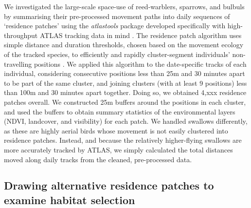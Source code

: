 We investigated the large-scale space-use of reed-warblers, sparrows, and bulbuls by summarising their pre-processed movement paths into daily sequences of `residence patches' using the \textit{atlastools} package developed specifically with high-throughput ATLAS tracking data in mind \citep{gupte2021b}.
The residence patch algorithm uses simple distance and duration thresholds, chosen based on the movement ecology of the tracked species, to efficiently and rapidly cluster-segment individuals' non-travelling positions \citep{gupte2021b}.
We applied this algorithm to the date-specific tracks of each individual, considering consecutive positions less than 25m and 30 minutes apart to be part of the same cluster, and joining clusters (with at least 9 positions) less than 100m and 30 minutes apart together.
Doing so, we obtained 4,xxx residence patches overall.
We constructed 25m buffers around the positions in each cluster, and used the buffers to obtain summary statistics of the environmental layers (NDVI, landcover, and visibility) for each patch.
We handled swallows differently, as these are highly aerial birds whose movement is not easily clustered into residence patches.
Instead, and because the relatively higher-flying swallows are more accurately tracked by ATLAS, we simply calculated the total distances moved along daily tracks from the cleaned, pre-processed data.

\subsection*{Drawing alternative residence patches to examine habitat selection}

